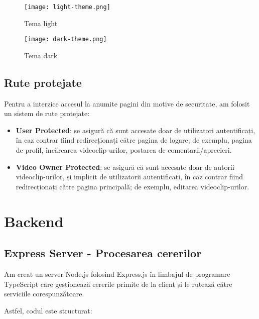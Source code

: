 \begin{figure}[h]
    \centering
    \begin{minipage}{0.49\textwidth}
        \centering
        \texttt{[image: light-theme.png]}
        \caption{Tema light}
        \label{fig:light-theme}
    \end{minipage}\hfill
    \begin{minipage}{0.49\textwidth}
        \centering
        \texttt{[image: dark-theme.png]}
        \caption{Tema dark}
        \label{fig:dark-theme}
    \end{minipage}
\end{figure}

\subsection{Rute protejate}
Pentru a interzice accesul la anumite pagini din motive de securitate, am folosit un sistem
de rute protejate:
\begin{itemize}
    \item \textbf{User Protected}: se asigură că sunt accesate doar de utilizatori autentificați,
    în caz contrar fiind redirecționați către pagina de logare; de exemplu, pagina de profil,
    încărcarea videoclip-urilor, postarea de comentarii/aprecieri.
    \item \textbf{Video Owner Protected}: se asigură că sunt accesate doar de autorii videoclip-urilor,
    și implicit de utilizatorii autentificați, în caz contrar fiind redirecționați către pagina principală;
    de exemplu, editarea videoclip-urilor.
\end{itemize}

\section{Backend}

\subsection{Express Server - Procesarea cererilor}
Am creat un server Node.js folosind Express.js în limbajul de programare TypeScript care
gestionează cererile primite de la client și le rutează către serviciile corespunzătoare.
\par
Astfel, codul este structurat: 

